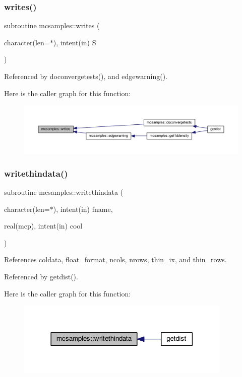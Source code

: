 \subsubsection{\texorpdfstring{writes()}{writes()}}
{\footnotesize\ttfamily subroutine mcsamples\+::writes (\begin{DoxyParamCaption}\item[{character(len=$\ast$), intent(in)}]{S }\end{DoxyParamCaption})}



Referenced by doconvergetests(), and edgewarning().

Here is the caller graph for this function\+:
\nopagebreak
\begin{figure}[H]
\begin{center}
\leavevmode
\includegraphics[width=350pt]{namespacemcsamples_a54c3f403eb92b30ff78476abea37462c_icgraph}
\end{center}
\end{figure}
\mbox{\label{namespacemcsamples_a98999c53910240226ec96e8ef0751a22}} 
\subsubsection{\texorpdfstring{writethindata()}{writethindata()}}
{\footnotesize\ttfamily subroutine mcsamples\+::writethindata (\begin{DoxyParamCaption}\item[{character(len=$\ast$), intent(in)}]{fname,  }\item[{real(mcp), intent(in)}]{cool }\end{DoxyParamCaption})}



References coldata, float\+\_\+format, ncols, nrows, thin\+\_\+ix, and thin\+\_\+rows.



Referenced by getdist().

Here is the caller graph for this function\+:
\nopagebreak
\begin{figure}[H]
\begin{center}
\leavevmode
\includegraphics[width=290pt]{namespacemcsamples_a98999c53910240226ec96e8ef0751a22_icgraph}
\end{center}
\end{figure}


